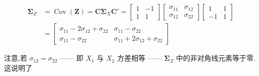 \[
\begin{aligned}
\bm{\Sigma}_Z &= \operatorname{Cov}(\bm{Z}) = \bm{C}\bm{\Sigma}_X\bm{C}' = \begin{bmatrix} 1 & -1 \\ 1 & 1 \end{bmatrix}\begin{bmatrix} \sigma_{11} & \sigma_{12} \\ \sigma_{12} & \sigma_{22} \end{bmatrix}\begin{bmatrix} 1 & 1 \\ -1 & 1 \end{bmatrix} \\
&= \begin{bmatrix} \sigma_{11} - 2\sigma_{12} + \sigma_{22} & \sigma_{11} - \sigma_{22} \\ \sigma_{11} - \sigma_{22} & \sigma_{11} + 2\sigma_{12} + \sigma_{22} \end{bmatrix}
\end{aligned}
\]

注意,若 $\sigma_{12} = \sigma_{22}$ —— 即 $X_1$ 与 $X_2$ 方差相等 —— $\bm{\Sigma}_Z$ 中的非对角线元素等于零.这说明了
